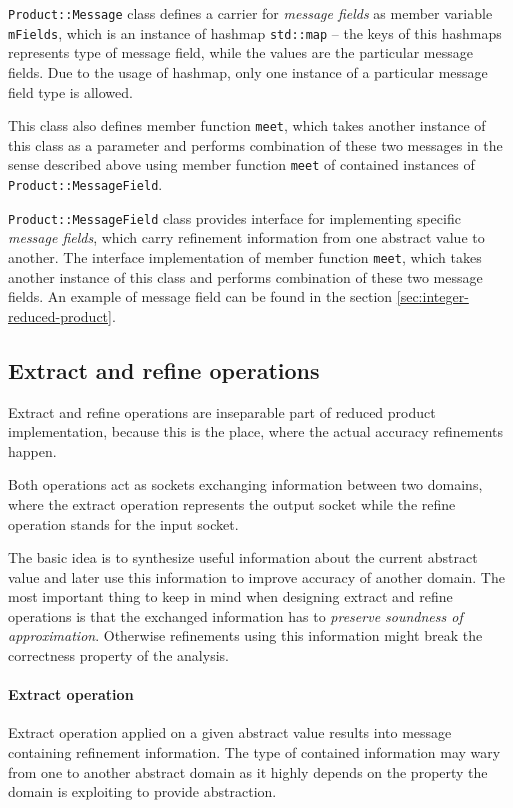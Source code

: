 \documentclass[12pt,oneside]{fithesis2}
\theoremstyle{definition}
\begin{document}
\texttt{Product::Message} class defines a carrier for \textit{message fields} as member variable \texttt{mFields}, which is an instance of hashmap \texttt{std::map} -- the keys of this hashmaps represents type of message field, while the values are the particular message fields. Due to the usage of hashmap, only one instance of a particular message field type is allowed.

This class also defines member function \texttt{meet}, which takes another instance of this class as a parameter and performs combination of these two messages in the sense described above using member function \texttt{meet} of contained instances of \texttt{Product::MessageField}.

\texttt{Product::MessageField} class provides interface for implementing specific \textit{message fields}, which carry refinement information from one abstract value to another. The interface implementation of member function \texttt{meet}, which takes another instance of this class and performs combination of these two message fields. An example of message field can be found in the section \ref{sec:integer-reduced-product}.

\subsection{Extract and refine operations}

Extract and refine operations are inseparable part of reduced product implementation, because this is the place, where the actual accuracy refinements happen.

Both operations act as sockets exchanging information between two domains, where the extract operation represents the output socket while the refine operation stands for the input socket.

The basic idea is to synthesize useful information about the current abstract value and later use this information to improve accuracy of another domain. The most important thing to keep in mind when designing extract and refine operations is that the exchanged information has to \textit{preserve soundness of approximation}. Otherwise refinements using this information might break the correctness property of the analysis.

\paragraph{Extract operation}
Extract operation applied on a given abstract value results into message containing refinement information. The type of contained information may wary from one to another abstract domain as it highly depends on the property the domain is exploiting to provide abstraction.
\end{document}
